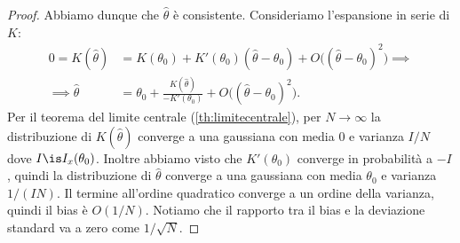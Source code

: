 \begin{proof}
	Abbiamo dunque che $\hat\theta$ è consistente.
	Consideriamo l'espansione in serie di $K$:
	\begin{align*}
		0 = K(\hat\theta)
		&= K(\theta_0) + K'(\theta_0)(\hat\theta-\theta_0) + O\big((\hat\theta-\theta_0)^2\big) \implies \\
		\implies \hat\theta
		&= \theta_0 + \frac{K(\hat\theta)}{-K'(\theta_0)} + O\big((\hat\theta-\theta_0)^2\big).
	\end{align*}
	Per il teorema del limite centrale (\autoref{th:limitecentrale}),
	per $N\to\infty$
	la distribuzione di $K(\hat\theta)$ converge a una gaussiana
	con media 0 e varianza $I/N$ dove $I\is I_x(\theta_0)$.
	Inoltre abbiamo visto che $K'(\theta_0)$ converge in probabilità a $-I$,
	quindi la distribuzione di $\hat\theta$ converge a una gaussiana
	con media $\theta_0$ e varianza $1/(IN)$.
	Il termine all'ordine quadratico converge a un ordine della varianza,
	quindi il bias è $O(1/N)$.
	Notiamo che il rapporto tra il bias e la deviazione standard va a zero come $1/\sqrt{N}$.
\end{proof}

